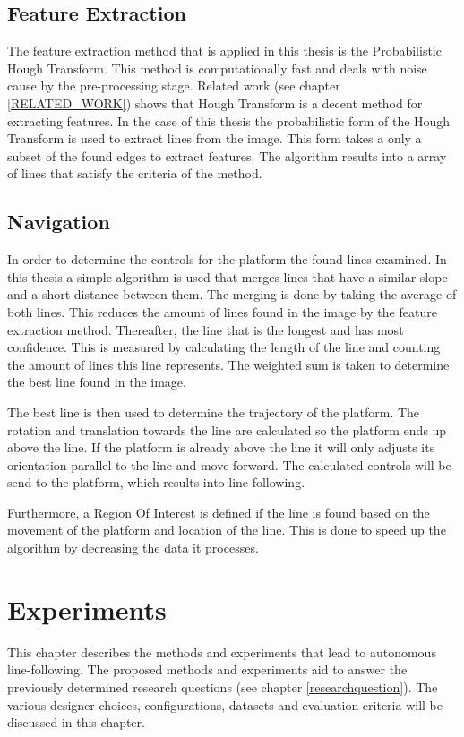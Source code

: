 \documentclass[a4paper]{article}
\begin{document}
\subsection{Feature Extraction}
The feature extraction method that is applied in this thesis is the Probabilistic Hough Transform. This method is computationally fast and deals with noise cause by the pre-processing stage. Related work (see chapter \ref{RELATED_WORK}) shows that Hough Transform is a decent method for extracting features. In the case of this thesis the probabilistic form of the Hough Transform\cite{Kiryati1991} is used to  extract lines from the image. This form takes a only a subset of the found edges to extract features. The algorithm results into a array of lines that satisfy the criteria of the method.

\subsection{Navigation}
In order to determine the controls for the platform the found lines examined. In this thesis a simple algorithm is used that merges lines that have a similar slope and a short distance between them. The merging is done by taking the average of both lines. This reduces the amount of lines found in the image by the feature extraction method. Thereafter, the line that is the longest and has most confidence. This is measured by calculating the length of the line and counting the amount of lines this line represents. The weighted sum is taken to determine the best line found in the image.

The best line is then used to determine the trajectory of the platform. The rotation and translation towards the line are calculated so the platform ends up above the line. If the platform is already above the line it will only adjusts its orientation parallel to the line and move forward. The calculated controls will be send to the platform, which results into line-following.

Furthermore, a Region Of Interest is defined if the line is found based on the movement of the platform and location of the line. This is done to speed up the algorithm by decreasing the data it processes.
\newpage
\section{Experiments}
\label{EXPERIMENTS}
This chapter describes the methods and experiments that lead to autonomous line-following. The proposed methods and experiments aid to answer the previously determined research questions (see chapter \ref{researchquestion}). The various designer choices, configurations, datasets and evaluation criteria will be discussed in this chapter.
\end{document}
